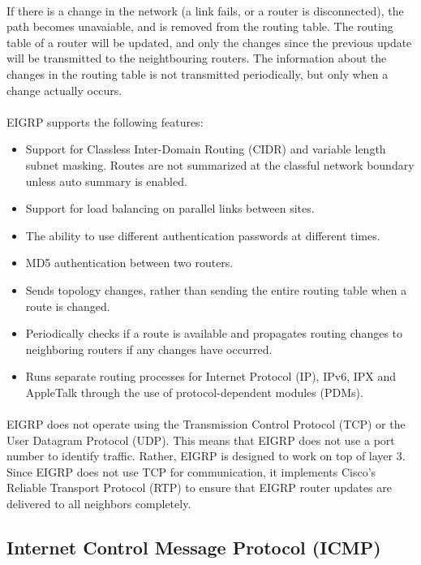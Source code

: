 \documentclass[12pt,a4paper]{report}
\begin{document}
\paragraph{}If there is a change in the network (a link fails, or a router is disconnected), the path becomes unavaiable, and is removed from the routing table. The routing table of a router will be updated, and only the changes since the previous update will be transmitted to the neightbouring routers. The information about the changes in the routing table is not transmitted periodically, but only when a change actually occurs.
\paragraph{}EIGRP supports the following features:
\begin{itemize}
	\item Support for Classless Inter-Domain Routing (CIDR) and variable length subnet masking. Routes are not summarized at the classful network boundary unless auto summary is enabled.
	\item Support for load balancing on parallel links between sites.
	\item The ability to use different authentication passwords at different times.
	\item MD5 authentication between two routers.
	\item Sends topology changes, rather than sending the entire routing table when a route is changed.
	\item Periodically checks if a route is available and propagates routing changes to neighboring routers if any changes have occurred.
	\item Runs separate routing processes for Internet Protocol (IP), IPv6, IPX and AppleTalk through the use of protocol-dependent modules (PDMs).
\end{itemize}
\paragraph{}EIGRP does not operate using the Transmission Control Protocol (TCP) or the User Datagram Protocol (UDP). This means that EIGRP does not use a port number to identify traffic. Rather, EIGRP is designed to work on top of layer 3. Since EIGRP does not use TCP for communication, it implements Cisco's Reliable Transport Protocol (RTP) to ensure that EIGRP router updates are delivered to all neighbors completely.

\subsection{Internet Control Message Protocol (ICMP)}
\end{document}
